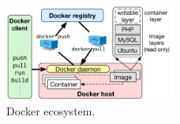 \begin{figure}
	\centering
	\includegraphics[width=0.5\textwidth]{graphs/fig-docker-architecture-v3}
	\caption{Docker ecosystem. 
	}
	\label{fig-docker-architecture}
\end{figure}
